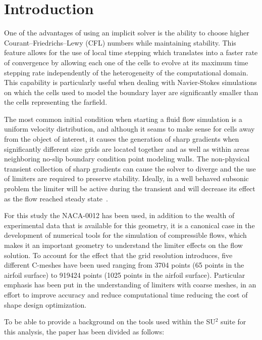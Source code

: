 
\section{Introduction}
One of the advantages of using an implicit solver is the ability to choose higher Courant–Friedrichs–Lewy (CFL) numbers while maintaining stability. This feature allows for the use of local time stepping which translates into a faster rate of convergence by allowing each one of the cells to evolve at its maximum time stepping rate independently of the heterogeneity of the computational domain. This capability is particularly useful when dealing with Navier-Stokes simulations on which the cells used to model the boundary layer are significantly smaller than the cells representing the farfield. 

The most common initial condition when starting a fluid flow simulation is a uniform velocity distribution, and although it seams to make sense for cells away from the object of interest, it causes the generation of sharp gradients when significantly different size grids are located together and as well as within areas neighboring no-slip boundary condition point modeling walls. The non-physical transient collection of sharp gradients can cause the solver to diverge and the use of limiters are required to preserve stability. Ideally, in a well behaved subsonic problem the limiter will be active during the transient and will decrease its effect as the flow reached steady state~\cite{Venkatakrishnan:1993}.

For this study the NACA-0012 has been used, in addition to the wealth of experimental data that is available for this geometry, it is a canonical case in the development of numerical tools for the simulation of compressible flows, which makes it an important geometry to understand the limiter effects on the flow solution. To account for the effect that the grid resolution introduces, five different C-meshes have been used ranging from 3704 points (65 points in the airfoil surface) to 919424 points (1025 points in the airfoil surface). Particular emphasis has been put in the understanding of limiters with coarse meshes, in an effort to improve accuracy and reduce computational time reducing the cost of shape design optimization.

To be able to provide a background on the tools used within the SU$^2$ suite for this analysis, the paper has been divided as follows: